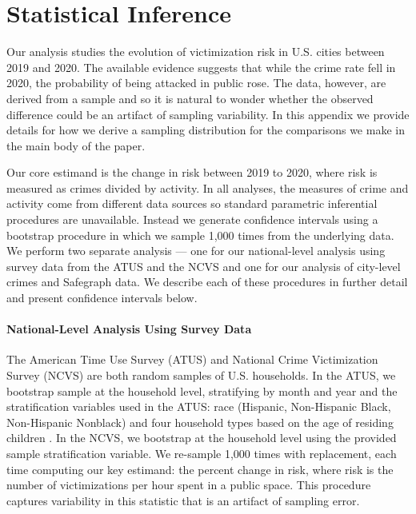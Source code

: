 \newpage
\clearpage
\section{Statistical Inference} \label{sec:inference}
Our analysis studies the evolution of victimization risk in U.S. cities between 2019 and 2020.  The available evidence suggests that while the crime rate fell in 2020, the probability of being attacked in public rose. The data, however, are derived from a sample and so it is natural to wonder whether the observed difference could be an artifact of sampling variability. In this appendix we provide details for how we derive a sampling distribution for the comparisons we make in the main body of the paper.

Our core estimand is the change in risk between 2019 to 2020, where risk is measured as crimes divided by activity. In all analyses, the measures of crime and activity come from different data sources so standard parametric inferential procedures are unavailable. 
Instead we generate confidence intervals using a bootstrap procedure in which we sample 1,000 times from the underlying data. We perform two separate analysis --- one for our national-level analysis using survey data from the ATUS and the NCVS and one for our analysis of city-level crimes and Safegraph data.  We describe each of these procedures in further detail and present confidence intervals below.

\paragraph{National-Level Analysis Using Survey Data} The American Time Use Survey (ATUS) and National Crime Victimization Survey (NCVS) are both random samples of U.S. households. In the ATUS, we bootstrap sample at the household level, stratifying by month and year and the stratification variables used in the ATUS: race (Hispanic, Non-Hispanic Black, Non-Hispanic Nonblack) and four household types based on the age of residing children \citep{atus_user_guide}. In the NCVS, we bootstrap at the household level using the provided sample stratification variable. We re-sample 1,000 times with replacement, each time computing our key estimand: the percent change in risk, where risk is the number of victimizations per hour spent in a public space. This procedure captures variability in this statistic that is an artifact of sampling error.

